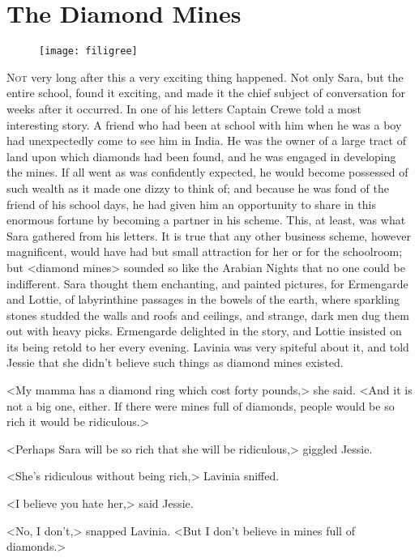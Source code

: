 \chapter{The Diamond Mines}

\begin{figure}[t!]
\centering
\texttt{[image: filigree]}
\end{figure}

\lettrine[lines=5]{N}{ot} very long after this a very exciting thing happened. Not only Sara, but the entire school, found it exciting, and made it the chief subject of conversation for weeks after it occurred. In one of his letters Captain Crewe told a most interesting story. A friend who had been at school with him when he was a boy had unexpectedly come to see him in India. He was the owner of a large tract of land upon which diamonds had been found, and he was engaged in developing the mines. If all went as was confidently expected, he would become possessed of such wealth as it made one dizzy to think of; and because he was fond of the friend of his school days, he had given him an opportunity to share in this enormous fortune by becoming a partner in his scheme. This, at least, was what Sara gathered from his letters. It is true that any other business scheme, however magnificent, would have had but small attraction for her or for the schoolroom; but <diamond mines> sounded so like the Arabian Nights that no one could be indifferent. Sara thought them enchanting, and painted pictures, for Ermengarde and Lottie, of labyrinthine passages in the bowels of the earth, where sparkling stones studded the walls and roofs and ceilings, and strange, dark men dug them out with heavy picks. Ermengarde delighted in the story, and Lottie insisted on its being retold to her every evening. Lavinia was very spiteful about it, and told Jessie that she didn't believe such things as diamond mines existed.

<My mamma has a diamond ring which cost forty pounds,> she said. <And it is not a big one, either. If there were mines full of diamonds, people would be so rich it would be ridiculous.>

<Perhaps Sara will be so rich that she will be ridiculous,> giggled Jessie.

<She's ridiculous without being rich,> Lavinia sniffed.

<I believe you hate her,> said Jessie.

<No, I don't,> snapped Lavinia. <But I don't believe in mines full of diamonds.>

